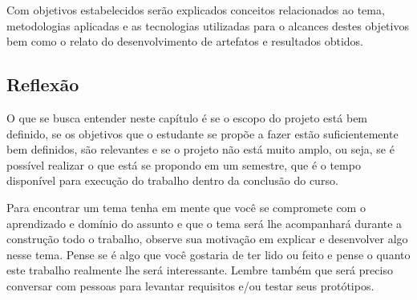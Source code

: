 Com objetivos estabelecidos serão explicados conceitos relacionados ao tema, metodologias aplicadas e as tecnologias utilizadas para o alcances destes objetivos bem como o relato do desenvolvimento de artefatos e resultados obtidos. 



 \subsection{Reflexão}
 O que se busca entender neste capítulo é se o escopo do projeto está bem definido, se os objetivos  que o estudante se propõe a fazer estão suficientemente bem definidos, são relevantes e se o projeto não está muito amplo, ou seja, se é possível realizar o que está se propondo em um semestre, que é o tempo disponível para execução do trabalho dentro da conclusão do curso.

Para encontrar um tema tenha em mente que você se compromete com o aprendizado e domínio do assunto e que o tema será lhe acompanhará durante a construção todo o trabalho, observe sua motivação em explicar e desenvolver algo nesse tema. Pense se é algo que você gostaria de ter lido ou feito e pense o quanto este trabalho realmente lhe será interessante. Lembre também que será preciso conversar com pessoas para levantar requisitos e/ou testar seus protótipos. 